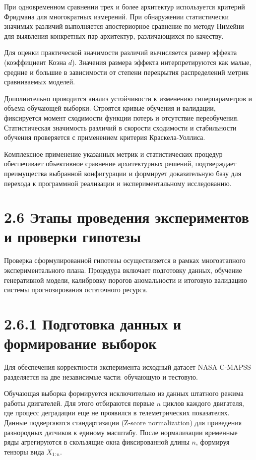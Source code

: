 \documentclass[14pt, a4paper, oneside]{extreport}
\begin{document}
При одновременном сравнении трех и более архитектур используется критерий Фридмана для многократных измерений. При обнаружении статистически значимых различий выполняется апостериорное сравнение по методу Нимейни для выявления конкретных пар архитектур, различающихся по качеству.

Для оценки практической значимости различий вычисляется размер эффекта (коэффициент Коэна $d$). Значения размера эффекта интерпретируются как малые, средние и большие в зависимости от степени перекрытия распределений метрик сравниваемых моделей.

Дополнительно проводится анализ устойчивости к изменению гиперпараметров и объема обучающей выборки. Строятся кривые обучения и валидации, фиксируется момент сходимости функции потерь и отсутствие переобучения. Статистическая значимость различий в скорости сходимости и стабильности обучения проверяется с применением критерия Краскела-Уоллиса.

Комплексное применение указанных метрик и статистических процедур обеспечивает объективное сравнение архитектурных решений, подтверждает преимущества выбранной конфигурации и формирует доказательную базу для перехода к программной реализации и экспериментальному исследованию.

\section{2.6 Этапы проведения экспериментов и проверки гипотезы}

Проверка сформулированной гипотезы осуществляется в рамках многоэтапного экспериментального плана. Процедура включает подготовку данных, обучение генеративной модели, калибровку порогов аномальности и итоговую валидацию системы прогнозирования остаточного ресурса.

\section{2.6.1 Подготовка данных и формирование выборок}

Для обеспечения корректности эксперимента исходный датасет NASA C-MAPSS разделяется на две независимые части: обучающую и тестовую.

Обучающая выборка формируется исключительно из данных штатного режима работы двигателей. Для этого отбираются первые $n$ циклов каждого двигателя, где процесс деградации еще не проявился в телеметрических показателях. Данные подвергаются стандартизации (Z-score normalization) для приведения разнородных датчиков к единому масштабу. После нормализации временные ряды агрегируются в скользящие окна фиксированной длины $n$, формируя тензоры вида $X_{1:n}$.
\end{document}
